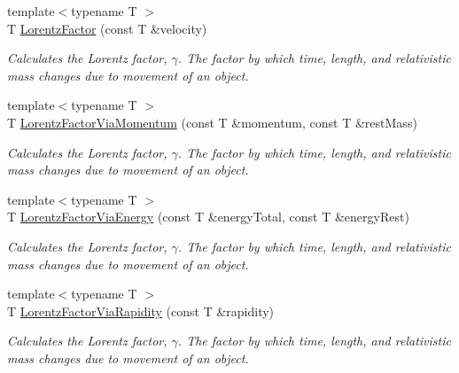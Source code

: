 \begin{DoxyCompactItemize}
{\footnotesize template$<$typename T $>$ }\\T \mbox{\hyperlink{group___e_g_x_phys-_lorentz_transformations_ga5f9b11c1f4c3ae26a7e64f02c22d5a75}{Lorentz\+Factor}} (const T \&velocity)
\begin{DoxyCompactList}\small\item\em Calculates the Lorentz factor, $\gamma$. The factor by which time, length, and relativistic mass changes due to movement of an object. \end{DoxyCompactList}\item 
{\footnotesize template$<$typename T $>$ }\\T \mbox{\hyperlink{group___e_g_x_phys-_lorentz_transformations_ga1ea24128654ac333dd843afdd5c003b7}{Lorentz\+Factor\+Via\+Momentum}} (const T \&momentum, const T \&rest\+Mass)
\begin{DoxyCompactList}\small\item\em Calculates the Lorentz factor, $\gamma$. The factor by which time, length, and relativistic mass changes due to movement of an object. \end{DoxyCompactList}\item 
{\footnotesize template$<$typename T $>$ }\\T \mbox{\hyperlink{group___e_g_x_phys-_lorentz_transformations_ga601de8c039be89a9abea22bc459436c9}{Lorentz\+Factor\+Via\+Energy}} (const T \&energy\+Total, const T \&energy\+Rest)
\begin{DoxyCompactList}\small\item\em Calculates the Lorentz factor, $\gamma$. The factor by which time, length, and relativistic mass changes due to movement of an object. \end{DoxyCompactList}\item 
{\footnotesize template$<$typename T $>$ }\\T \mbox{\hyperlink{group___e_g_x_phys-_lorentz_transformations_ga8064f5bce1d2ca5f7bc39d95ba4d2dd9}{Lorentz\+Factor\+Via\+Rapidity}} (const T \&rapidity)
\begin{DoxyCompactList}\small\item\em Calculates the Lorentz factor, $\gamma$. The factor by which time, length, and relativistic mass changes due to movement of an object. \end{DoxyCompactList}\end{DoxyCompactItemize}
